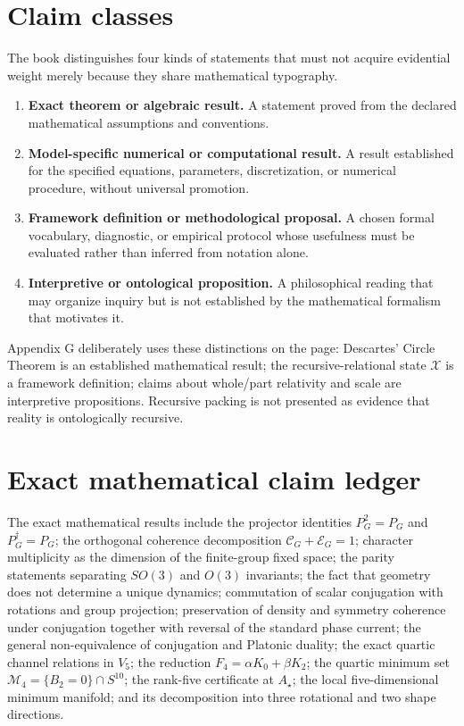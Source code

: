 \section*{Claim classes}

The book distinguishes four kinds of statements that must not acquire evidential weight merely because they share mathematical typography.

\begin{enumerate}[label=\arabic*.]
\item \textbf{Exact theorem or algebraic result.} A statement proved from the declared mathematical assumptions and conventions.
\item \textbf{Model-specific numerical or computational result.} A result established for the specified equations, parameters, discretization, or numerical procedure, without universal promotion.
\item \textbf{Framework definition or methodological proposal.} A chosen formal vocabulary, diagnostic, or empirical protocol whose usefulness must be evaluated rather than inferred from notation alone.
\item \textbf{Interpretive or ontological proposition.} A philosophical reading that may organize inquiry but is not established by the mathematical formalism that motivates it.
\end{enumerate}

Appendix G deliberately uses these distinctions on the page: Descartes' Circle Theorem is an established mathematical result; the recursive-relational state $\mathcal X$ is a framework definition; claims about whole/part relativity and scale are interpretive propositions. Recursive packing is not presented as evidence that reality is ontologically recursive.

\section*{Exact mathematical claim ledger}

The exact mathematical results include the projector identities $P_G^2=P_G$ and $P_G^\dagger=P_G$; the orthogonal coherence decomposition $\mathscr C_G+\mathscr E_G=1$; character multiplicity as the dimension of the finite-group fixed space; the parity statements separating $SO(3)$ and $O(3)$ invariants; the fact that geometry does not determine a unique dynamics; commutation of scalar conjugation with rotations and group projection; preservation of density and symmetry coherence under conjugation together with reversal of the standard phase current; the general non-equivalence of conjugation and Platonic duality; the exact quartic channel relations in $V_5$; the reduction $F_4=\alpha K_0+\beta K_2$; the quartic minimum set $\mathcal M_4=\{B_2=0\}\cap S^{10}$; the rank-five certificate at $A_\star$; the local five-dimensional minimum manifold; and its decomposition into three rotational and two shape directions.

